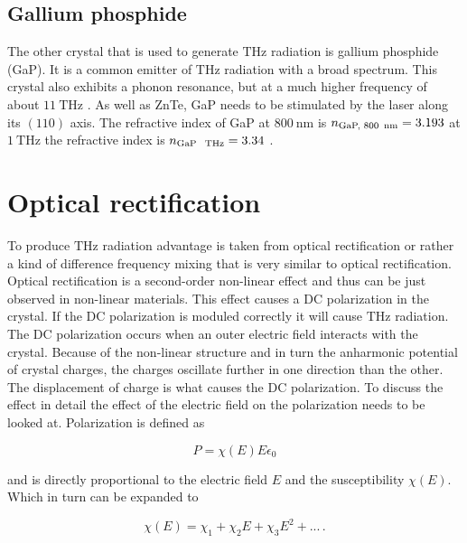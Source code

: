 \subsection{Gallium phosphide}
The other crystal that is used to generate $\si{\tera\hertz}$ radiation is gallium phosphide (GaP).
It is a common emitter of $\si{\tera\hertz}$ radiation with a broad spectrum.
This crystal also exhibits a phonon resonance, but at a much higher frequency of about $\SI{11}{\tera\hertz}$ \cite{wiki_book}.
As well as ZnTe, GaP needs to be stimulated by the laser along its $(110)$ axis.
The refractive index of GaP at $\SI{800}{\nano\meter}$ is $n_\text{GaP, 800\, nm} = 3.193$ \cite{refractive_index_gap} at $\SI{1}{\tera\hertz}$ the refractive index is $n_\text{GaP \, THz} = 3.34$ \cite{hebling2004tunable}.


\section{Optical rectification}\label{sec:optic_ref}
To produce $\si{\tera\hertz}$ radiation advantage is taken from optical rectification or rather a kind of difference frequency mixing that is very similar to optical rectification.
Optical rectification is a second-order non-linear effect and thus can be just observed in non-linear materials.
This effect causes a DC polarization in the crystal.
If the DC polarization is moduled correctly it will cause $\si{\tera\hertz}$ radiation.
The DC polarization occurs when an outer electric field interacts with the crystal.
Because of the non-linear structure and in turn the anharmonic potential of crystal charges, the charges oscillate further in one direction than the other.
The displacement of charge is what causes the DC polarization.
To discuss the effect in detail the effect of the electric field on the polarization needs to be looked at.
Polarization is defined as

\begin{equation}
P = \chi(E) E \epsilon_0
\end{equation}

and is directly proportional to the electric field $E$ and the susceptibility $\chi(E)$.
Which in turn can be expanded to 

\begin{equation}
    \chi(E) = \chi_1 + \chi_2 E +\chi_3 E^2 + ...   \, .
\end{equation}

